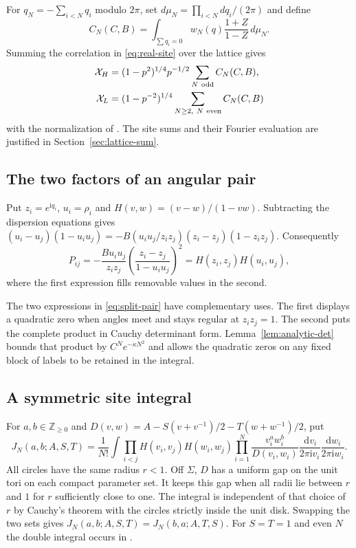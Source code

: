 \documentclass[11pt]{article}
\numberwithin{equation}{section}
\theoremstyle{definition}
\newcommand{\ii}{\mathrm i}
\newcommand{\dd}{\,\mathrm d}
\begin{document}
For $q_N=-\sum_{i<N}q_i$ modulo $2\pi$, set
$d\mu_N=\prod_{i<N}dq_i/(2\pi)$ and define
\begin{equation}\label{eq:complete-angular}
 C_N(C,B)=\int_{\sum q_i=0} w_N(q)\frac{1+Z}{1-Z}\,d\mu_N .
\end{equation}
Summing the correlation in \eqref{eq:real-site} over the lattice gives
\begin{align}
 \mathcal X_H&=(1-p^2)^{1/4}p^{-1/2}
                    \sum_{N\ {\rm odd}} C_N(C,B),\label{eq:physical-formsH}\\
 \mathcal X_L&=(1-p^{-2})^{1/4}
                    \sum_{N\ge2,\ N\ {\rm even}} C_N(C,B)
                    \label{eq:physical-forms}
\end{align}
with the normalization of \cite[(1.8)--(1.10), (3.13)]{ONGP}.
The site sums and their Fourier evaluation are justified in
Section~\ref{sec:lattice-sum}.

\subsection{The two factors of an angular pair}

Put $z_i=e^{\ii q_i}$, $u_i=\rho_i$ and $H(v,w)=(v-w)/(1-vw)$.
Subtracting the dispersion equations gives
$(u_i-u_j)(1-u_i u_j)=-B(u_i u_j/z_i z_j)(z_i-z_j)(1-z_i z_j)$.
Consequently
\begin{equation}\label{eq:split-pair}
 P_{ij}=-\frac{Bu_i u_j}{z_i z_j}
        \left(\frac{z_i-z_j}{1-u_i u_j}\right)^2
       =H(z_i,z_j)H(u_i,u_j),
\end{equation}
where the first expression fills removable values in the second.

The two expressions in \eqref{eq:split-pair} have complementary uses.
The first displays a quadratic zero when angles meet and stays regular
at $z_i z_j=1$. The second puts the complete product in Cauchy
determinant form. Lemma~\ref{lem:analytic-det} bounds that product by
$C^N e^{-\kappa N^2}$ and allows the quadratic zeros on any fixed
block of labels to be retained in the integral.

\subsection{A symmetric site integral}

For $a,b\in\mathbb Z_{\ge0}$ and $D(v,w)=A-S(v+v^{-1})/2-T(w+w^{-1})/2$, put
\begin{equation}\label{eq:double-site}
 J_N(a,b;A,S,T)=\frac1{N!}\int
 \prod_{i<j} H(v_i,v_j)H(w_i,w_j)
 \prod_{i=1}^N \frac{v_i^a w_i^b}{D(v_i,w_i)}
      \frac{\dd v_i}{2\pi\ii v_i}\frac{\dd w_i}{2\pi\ii w_i}.
\end{equation}
All circles have the same radius $r<1$. Off $\Sigma$, $D$ has a
uniform gap on the unit tori on each compact parameter set. It keeps
this gap when all radii lie between $r$ and $1$ for $r$ sufficiently
close to one. The integral is independent of that choice of $r$
by Cauchy's theorem with the circles strictly inside the unit disk.
Swapping the two sets gives $J_N(a,b;A,S,T)=J_N(b,a;A,T,S)$.
For $S=T=1$ and even $N$ the double integral occurs in
\cite[Appendix~1, (7)--(8)]{TW}.
\end{document}

